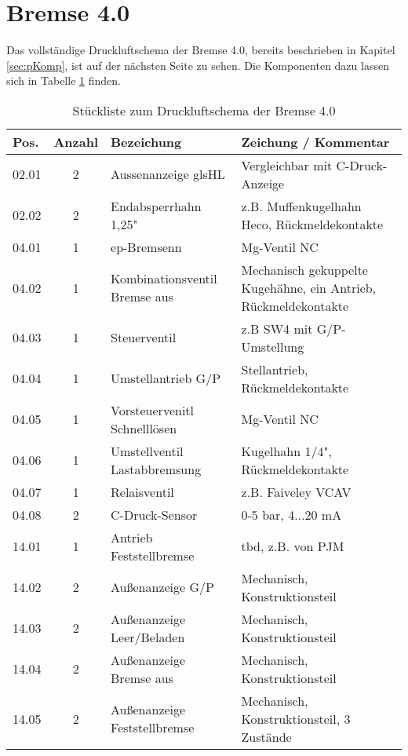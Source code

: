 \section{Bremse 4.0}\label{sec:A_Bremse40}
Das vollständige Druckluftschema der \gls{Bremse 4.0}, bereits beschrieben in Kapitel \ref{sec:pKomp}, ist auf der nächsten Seite  zu sehen. Die Komponenten dazu lassen sich in Tabelle \ref{tab:Bremse40Komp} finden.
\begin{table}[h]
    \centering
    \begin{tabular}{|p{3em}cp{10.5em}p{18.5em}|}
    \hline
    Pos.  & \multicolumn{1}{p{2.5em}}{Anzahl} & Bezeichung & Zeichung / Kommentar  \\\hline
    02.01 & 2     & Aussenanzeige gls{HL} & Vergleichbar mit C-Druck-Anzeige \\
    02.02 & 2     & Endabsperrhahn 1,25" & z.B. Muffenkugelhahn Heco, Rückmeldekontakte \\
    
    04.01 & 1     & \gls{ep-Bremsen}n & Mg-Ventil NC \\
    04.02 & 1     & Kombinationsventil Bremse aus & Mechanisch gekuppelte Kugehähne, ein Antrieb, Rückmeldekontakte \\
    04.03 & 1     & Steuerventil & z.B SW4 mit G/P-Umstellung \\
    04.04 & 1     & Umstellantrieb G/P & Stellantrieb, Rückmeldekontakte \\
    04.05 & 1     & Vorsteuervenitl Schnelllösen & Mg-Ventil NC \\
    04.06 & 1     & Umstellventil Lastabbremsung & Kugelhahn 1/4", Rückmeldekontakte \\
    04.07 & 1     & Relaisventil & z.B. Faiveley VCAV \\
    04.08 & 2     & C-Druck-Sensor & 0-5 bar, 4...20 mA \\
    
    14.01 & 1     & Antrieb Feststellbremse & tbd, z.B. von PJM \\
    14.02 & 2     & Außenanzeige G/P & Mechanisch, Konstruktionsteil \\
    14.03 & 2     & Außenanzeige Leer/Beladen & Mechanisch, Konstruktionsteil \\
    14.04 & 2     & Außenanzeige Bremse aus & Mechanisch, Konstruktionsteil \\
    14.05 & 2     & Außenanzeige Feststellbremse & Mechanisch, Konstruktionsteil, 3 Zustände \\\hline
    \end{tabular}%
    \caption{Stückliste zum Druckluftschema der Bremse 4.0}
    \label{tab:Bremse40Komp}
\end{table}
